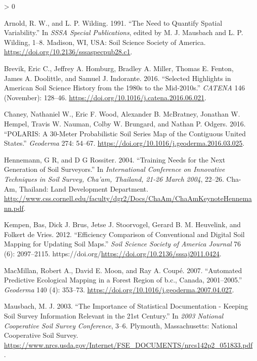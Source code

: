 \documentclass[
  ignorenonframetext,
]{beamer}
\newlength{\cslhangindent}
\newenvironment{CSLReferences}[2] %
 {%
  \setlength{\parindent}{0pt}
  \ifodd #1 \everypar{\setlength{\hangindent}{\cslhangindent}}\ignorespaces\fi
  \ifnum #2 > 0
  \setlength{\parskip}{#2\baselineskip}
  \fi
 }%
 {}
\begin{document}
\begin{frame}
\hypertarget{refs}{}
\begin{CSLReferences}{1}{0}
\leavevmode\hypertarget{ref-arnold1991}{}%
Arnold, R. W., and L. P. Wilding. 1991. {``The {Need} to {Quantify}
{Spatial} {Variability}.''} In \emph{{SSSA} {Special} {Publications}},
edited by M. J. Mausbach and L. P. Wilding, 1--8. Madison, WI, USA: Soil
Science Society of America.
\url{https://doi.org/10.2136/sssaspecpub28.c1}.

\leavevmode\hypertarget{ref-brevik2016}{}%
Brevik, Eric C., Jeffrey A. Homburg, Bradley A. Miller, Thomas E.
Fenton, James A. Doolittle, and Samuel J. Indorante. 2016. {``Selected
Highlights in American Soil Science History from the 1980s to the
Mid-2010s.''} \emph{{CATENA}} 146 (November): 128--46.
\url{https://doi.org/10.1016/j.catena.2016.06.021}.

\leavevmode\hypertarget{ref-chaney2016}{}%
Chaney, Nathaniel W., Eric F. Wood, Alexander B. McBratney, Jonathan W.
Hempel, Travis W. Nauman, Colby W. Brungard, and Nathan P. Odgers. 2016.
{``{POLARIS}: A 30-Meter Probabilistic Soil Series Map of the Contiguous
United States.''} \emph{Geoderma} 274: 54--67.
\url{https://doi.org/10.1016/j.geoderma.2016.03.025}.

\leavevmode\hypertarget{ref-hennemann2004}{}%
Hennemann, G R, and D G Rossiter. 2004. {``Training Needs for the Next
Generation of Soil Surveyors.''} In \emph{International Conference on
Innovative Techniques in Soil Survey, Cha'am, Thailand, 21-26 March
2004}, 22--26. Cha-Am, Thailand: Land Development Department.
\url{http://www.css.cornell.edu/faculty/dgr2/Docs/ChaAm/ChaAmKeynoteHennemann.pdf}.

\leavevmode\hypertarget{ref-kempen2012}{}%
Kempen, Bas, Dick J. Brus, Jetse J. Stoorvogel, Gerard B. M. Heuvelink,
and Folkert de Vries. 2012. {``Efficiency Comparison of Conventional and
Digital Soil Mapping for Updating Soil Maps.''} \emph{Soil Science
Society of America Journal} 76 (6): 2097--2115.
https://doi.org/\url{https://doi.org/10.2136/sssaj2011.0424}.

\leavevmode\hypertarget{ref-macmillan2007}{}%
MacMillan, Robert A., David E. Moon, and Ray A. Coupé. 2007.
{``Automated Predictive Ecological Mapping in a Forest Region of b.c.,
Canada, 2001--2005.''} \emph{Geoderma} 140 (4): 353--73.
\url{https://doi.org/10.1016/j.geoderma.2007.04.027}.

\leavevmode\hypertarget{ref-mausbach2003}{}%
Mausbach, M. J. 2003. {``The Importance of Statistical Documentation -
Keeping Soil Survey Information Relevant in the 21st Century.''} In
\emph{2003 National Cooperative Soil Survey Conference}, 3--6. Plymouth,
Massachusetts: National Cooperative Soil Survey.
\url{https://www.nrcs.usda.gov/Internet/FSE_DOCUMENTS/nrcs142p2_051833.pdf}.


\end{CSLReferences}
\end{frame}
\end{document}
